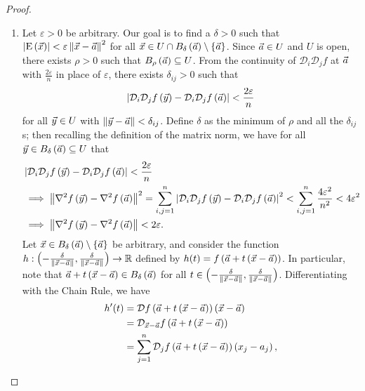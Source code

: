\documentclass[main.tex]{subfiles}
\begin{document}
\begin{proof}
    \begin{enumerate}
        \item Let $\varepsilon > 0$ be arbitrary. Our goal is to find a $\delta > 0$ such that $\left\lvert \mathrm{E}\left( \vec{x} \right) \right\rvert < \varepsilon\left\lVert \vec{x} - \vec{a} \right\rVert^2$ for all $\vec{x}\in U\cap B_\delta\left( \vec{a} \right)\setminus\left\{ \vec{a} \right\}$. Since $\vec{a}\in U$ and $U$ is open, there exists $\rho > 0$ such that $B_\rho\left( \vec{a} \right)\subseteq U$. From the continuity of $\mathcal{D}_i\mathcal{D}_jf$ at $\vec{a}$ with $\frac{2\varepsilon}{n}$ in place of $\varepsilon$, there exists $\delta_{ij} > 0$ such that
        \[\left\lvert \mathcal{D}_i\mathcal{D}_jf\left( \vec{y} \right) - \mathcal{D}_i\mathcal{D}_jf\left( \vec{a} \right) \right\rvert < \frac{2\varepsilon}{n}\]
        for all $\vec{y}\in U$ with $\left\lVert \vec{y} - \vec{a} \right\rVert < \delta_{ij}$. Define $\delta$ as the minimum of $\rho$ and all the $\delta_{ij}$s; then recalling the definition of the matrix norm, we have for all $\vec{y}\in B_\delta\left( \vec{a} \right)\subseteq U$ that
        \begin{align*}
            &\left\lvert \mathcal{D}_i\mathcal{D}_jf\left( \vec{y} \right) - \mathcal{D}_i\mathcal{D}_jf\left( \vec{a} \right) \right\rvert < \frac{2\varepsilon}{n} \\
            &\implies \left\lVert \nabla^2 f\left( \vec{y} \right) - \nabla^2f\left( \vec{a} \right) \right\rVert^2 = \sum_{i, j = 1}^n \left\lvert \mathcal{D}_i\mathcal{D}_jf\left( \vec{y} \right) - \mathcal{D}_i\mathcal{D}_jf\left( \vec{a} \right) \right\rvert^2 < \sum_{i, j = 1}^n \frac{4\varepsilon^2}{n^2} < 4\varepsilon^2\\
            &\implies \left\lVert \nabla^2 f\left( \vec{y} \right) - \nabla^2f\left( \vec{a} \right) \right\rVert < 2\varepsilon.
        \end{align*}
        Let $\vec{x}\in B_\delta\left( \vec{a} \right) \setminus\left\{ \vec{a} \right\}$ be arbitrary, and consider the function $h : \left( -\frac{\delta}{\left\lVert \vec{x} - \vec{a} \right\rVert}, \frac{\delta}{\left\lVert \vec{x} - \vec{a} \right\rVert} \right)\to \mathbb R$ defined by $h(t) = f\left( \vec{a} + t\left( \vec{x} - \vec{a} \right) \right)$. In particular, note that $\vec{a} + t\left( \vec{x} - \vec{a} \right)\in B_\delta\left( \vec{a} \right)$ for all $t\in \left( -\frac{\delta}{\left\lVert \vec{x} - \vec{a} \right\rVert}, \frac{\delta}{\left\lVert \vec{x} - \vec{a} \right\rVert} \right)$. Differentiating with the Chain Rule, we have
        \begin{align*}
            h'(t) &= \mathcal{D}f\left( \vec{a} + t\left( \vec{x} - \vec{a} \right) \right)\left( \vec{x} - \vec{a} \right) \\
            &= \mathcal{D}_{\vec{x} - \vec{a}} f\left( \vec{a} + t\left( \vec{x} - \vec{a} \right) \right) \\
            &= \sum_{j = 1}^n \mathcal{D}_j f\left( \vec{a} + t\left( \vec{x} - \vec{a} \right) \right)\left( x_j - a_j \right),
        \end{align*}

\end{enumerate}
\end{proof}
\end{document}
